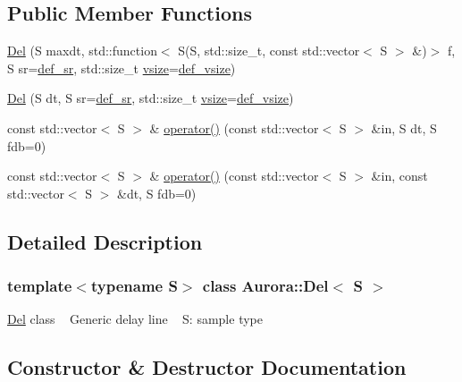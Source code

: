\subsection*{Public Member Functions}
\begin{DoxyCompactItemize}
\item 
\hyperlink{class_aurora_1_1_del_afd16ac7a75350b2c3971ffed64b6ef18}{Del} (S maxdt, std\+::function$<$ S(S, std\+::size\+\_\+t, const std\+::vector$<$ S $>$ \&)$>$ f, S sr=\hyperlink{namespace_aurora_ad49263d809bea98dd422e95bc91bc03e}{def\+\_\+sr}, std\+::size\+\_\+t \hyperlink{class_aurora_1_1_snd_base_af9e21aaf411b17f7a8221c991ce5d291}{vsize}=\hyperlink{namespace_aurora_afaaddf667a06e7ce23c667a8b7295263}{def\+\_\+vsize})
\item 
\hyperlink{class_aurora_1_1_del_ae7ee559e909a215a6d8248d9c9a0ced8}{Del} (S dt, S sr=\hyperlink{namespace_aurora_ad49263d809bea98dd422e95bc91bc03e}{def\+\_\+sr}, std\+::size\+\_\+t \hyperlink{class_aurora_1_1_snd_base_af9e21aaf411b17f7a8221c991ce5d291}{vsize}=\hyperlink{namespace_aurora_afaaddf667a06e7ce23c667a8b7295263}{def\+\_\+vsize})
\item 
const std\+::vector$<$ S $>$ \& \hyperlink{class_aurora_1_1_del_aa45ad145253210b01c24b3d0b82a2dd9}{operator()} (const std\+::vector$<$ S $>$ \&in, S dt, S fdb=0)
\item 
const std\+::vector$<$ S $>$ \& \hyperlink{class_aurora_1_1_del_a504900b27ce5849bebe55a675db175bd}{operator()} (const std\+::vector$<$ S $>$ \&in, const std\+::vector$<$ S $>$ \&dt, S fdb=0)
\end{DoxyCompactItemize}


\subsection{Detailed Description}
\subsubsection*{template$<$typename S$>$\newline
class Aurora\+::\+Del$<$ S $>$}

\hyperlink{class_aurora_1_1_del}{Del} class ~\newline
Generic delay line ~\newline
S\+: sample type 

\subsection{Constructor \& Destructor Documentation}
\mbox{\label{class_aurora_1_1_del_afd16ac7a75350b2c3971ffed64b6ef18}} 
